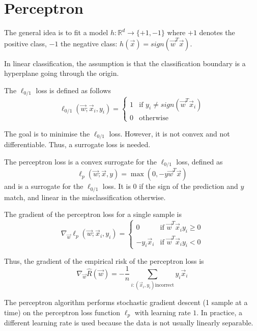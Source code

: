 \section{Perceptron}
The general idea is to fit a model
$h: \mathbb{R}^d \to \{+1, -1\}$ where $+1$ denotes the positive
class, $-1$ the negative class:
$h(\vec{x}) = sign(\vec{w}^T \vec{x})$.

In linear classification, the assumption is that
the classification boundary is a hyperplane
going through the origin.

The $\ell_{0/1}$ loss is defined as follows
\begin{equation*}
    \ell_{0/1}(\vec{w}; \vec{x}_i, y_i) =
    \begin{cases}
        1 & \text{if $y_i \neq sign(\vec{w}^T \vec{x}_i)$} \\
        0 & \text{otherwise}
    \end{cases}
\end{equation*}

The goal is to minimise the $\ell_{0/1}$ loss.
However, it is not convex and not differentiable.
Thus, a surrogate loss is needed.

The perceptron loss is a convex surrogate for the
$\ell_{0/1}$ loss, defined as
\begin{equation*}
    \ell_p(\vec{w}; \vec{x}, y) =
    \max(0, -y \vec{w}^T \vec{x})
\end{equation*}
and is a surrogate for the $\ell_{0/1}$ loss.
It is $0$ if the sign of the prediction and $y$ match,
and linear in the misclassification otherwise.

The gradient of the perceptron loss for a single sample is
\begin{equation*}
    \nabla_{\vec{w}} \ell_p(\vec{w}; \vec{x}_i, y_i) =
    \begin{cases}
        0 & \text{if $\vec{w}^T \vec{x}_i y_i \geq 0$} \\
        -y_i \vec{x}_i & \text{if $\vec{w}^T \vec{x}_i y_i < 0$}
    \end{cases}
\end{equation*}

Thus, the gradient of the empirical risk of the perceptron loss is
\begin{equation*}
    \nabla_{\vec{w}} \hat{R}(\vec{w})
    = - \frac{1}{n} \sum_{i : (\vec{x}_i, y_i) \text{incorrect}}{
        y_i \vec{x}_i
    }
\end{equation*}

The perceptron algorithm performs stochastic gradient descent
(1 sample at a time) on the perceptron loss function
$\ell_p$ with learning rate $1$.
In practice, a different learning rate is used
because the data is not usually linearly separable.

